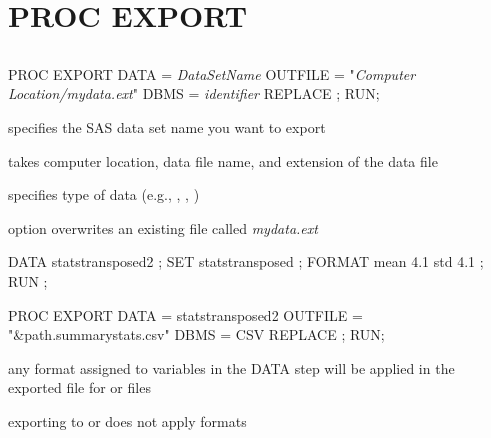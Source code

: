 \section[PROC EXPORT]{PROC EXPORT}
\subsection{}
\begin{frame}
\end{frame}

\begin{frame}[fragile]
\footnotesize
\begin{code}{.0}
PROC EXPORT
   DATA = \emph{DataSetName}
   OUTFILE = "\emph{Computer Location/mydata.ext}"
   DBMS = \emph{identifier}
   REPLACE ;
RUN;
\end{code}
\emp
\vskip10pt
 \hspace{0.05in} \emp
{}
\bi
\item[\fbox{\ttt{DATA=}}] specifies the SAS data set name you want to export
\item[\fbox{\ttt{OUTFILE=}}] takes computer location, data file name, and extension of the data file
\item[\fbox{\ttt{DBMS=}}] specifies type of data (e.g., , , )
\item[\fbox{\ttt{REPLACE}}] option overwrites an existing file called \emph{mydata.ext}
\ei
\emp
\end{frame}

\begin{frame}[fragile]
\footnotesize
\begin{code}{.0}
DATA statstransposed2 ;
   SET statstransposed ;
   FORMAT mean 4.1 std 4.1 ;
RUN ;

PROC EXPORT
   DATA = statstransposed2
   OUTFILE = "&path.summarystats.csv"
   DBMS = CSV
   REPLACE ;
RUN;
\end{code}
\emp
{} \hspace{0.05in} \emp
{}
\bi
\item any format assigned to variables in the DATA step will be applied in the exported file for  or  files
\item exporting to  or  does not apply formats
\ei
\emp
\end{frame}

 